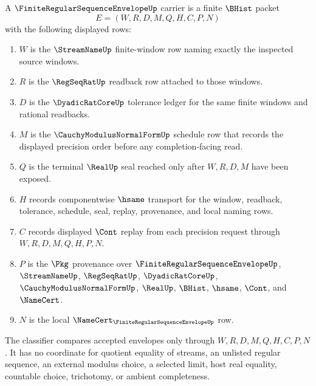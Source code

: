\begin{definition}
\label{def:finite-regular-sequence-envelope-carrier}
A $\FiniteRegularSequenceEnvelopeUp$ carrier is a finite $\BHist$ packet
$$
E=(W,R,D,M,Q,H,C,P,N)
$$
with the following displayed rows:
\begin{enumerate}
\item $W$ is the $\StreamNameUp$ finite-window row naming exactly the inspected source windows.
\item $R$ is the $\RegSeqRatUp$ readback row attached to those windows.
\item $D$ is the $\DyadicRatCoreUp$ tolerance ledger for the same finite windows and rational readbacks.
\item $M$ is the $\CauchyModulusNormalFormUp$ schedule row that records the displayed precision order before any completion-facing read.
\item $Q$ is the terminal $\RealUp$ seal reached only after $W,R,D,M$ have been exposed.
\item $H$ records componentwise $\hsame$ transport for the window, readback, tolerance, schedule, seal, replay, provenance, and local naming rows.
\item $C$ records displayed $\Cont$ replay from each precision request through $W,R,D,M,Q,H,P,N$.
\item $P$ is the $\Pkg$ provenance over $\FiniteRegularSequenceEnvelopeUp$, $\StreamNameUp$, $\RegSeqRatUp$, $\DyadicRatCoreUp$, $\CauchyModulusNormalFormUp$, $\RealUp$, $\BHist$, $\hsame$, $\Cont$, and $\NameCert$.
\item $N$ is the local $\NameCert_{\FiniteRegularSequenceEnvelopeUp}$ row.
\end{enumerate}
The classifier compares accepted envelopes only through $W,R,D,M,Q,H,C,P,N$. It has no coordinate for quotient equality of streams, an unlisted regular sequence, an external modulus choice, a selected limit, host real equality, countable choice, trichotomy, or ambient completeness.
\end{definition}


